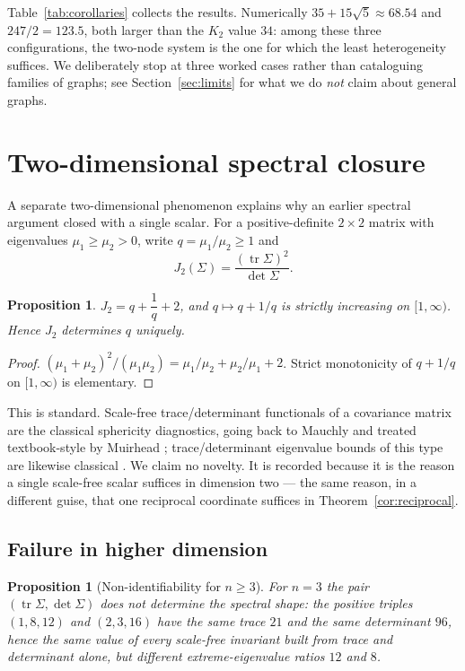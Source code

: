 \documentclass[11pt]{article}
\theoremstyle{plain}
\newtheorem{proposition}[theorem]{Proposition}
\theoremstyle{definition}
\theoremstyle{remark}
\newcommand{\tr}{\operatorname{tr}}
\newcommand{\Sig}{\Sigma}
\begin{document}
Table~\ref{tab:corollaries} collects the results. Numerically $35+15\sqrt5\approx68.54$ and
$247/2=123.5$, both larger than the $K_2$ value $34$: among these three configurations, the
two-node system is the one for which the least heterogeneity suffices. We deliberately stop at
three worked cases rather than cataloguing families of graphs; see Section~\ref{sec:limits} for
what we do \emph{not} claim about general graphs.

\section{Two-dimensional spectral closure}\label{sec:closure}

A separate two-dimensional phenomenon explains why an earlier spectral argument closed with a
single scalar. For a positive-definite $2\times2$ matrix with eigenvalues $\mu_1\ge\mu_2>0$,
write $q=\mu_1/\mu_2\ge1$ and
\begin{equation}
  J_2(\Sig)=\frac{(\tr\Sig)^2}{\det\Sig}. \label{eq:J2}
\end{equation}

\begin{proposition}\label{prop:J2}
$J_2=q+\dfrac1q+2$, and $q\mapsto q+1/q$ is strictly increasing on $[1,\infty)$. Hence $J_2$
determines $q$ uniquely.
\end{proposition}

\begin{proof}
$(\mu_1+\mu_2)^2/(\mu_1\mu_2)=\mu_1/\mu_2+\mu_2/\mu_1+2$. Strict monotonicity of $q+1/q$ on
$[1,\infty)$ is elementary.
\end{proof}

This is standard. Scale-free trace/determinant functionals of a covariance matrix are the
classical sphericity diagnostics, going back to Mauchly \cite{Mauchly1940} and treated
textbook-style by Muirhead \cite[Ch.~8]{Muirhead1982}; trace/determinant eigenvalue bounds of this
type are likewise classical \cite{WolkowiczStyan1980,HornJohnson2012}. We claim no novelty. It is recorded because
it is the reason a single scale-free scalar suffices in dimension two --- the same reason, in a
different guise, that one reciprocal coordinate suffices in Theorem~\ref{cor:reciprocal}.

\subsection{Failure in higher dimension}\label{sec:obstruction}

\begin{proposition}[Non-identifiability for $n\ge3$]\label{prop:obstruction}
For $n=3$ the pair $(\tr\Sig,\det\Sig)$ does not determine the spectral shape: the positive
triples $(1,8,12)$ and $(2,3,16)$ have the same trace $21$ and the same determinant $96$, hence
the same value of every scale-free invariant built from trace and determinant alone, but
different extreme-eigenvalue ratios $12$ and $8$.
\end{proposition}
\end{document}
